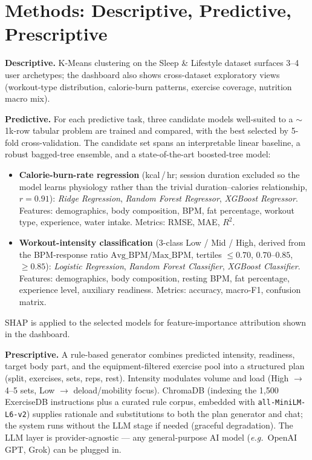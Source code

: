 \documentclass[10pt,a4paper]{article}
\begin{document}
\section{Methods: Descriptive, Predictive, Prescriptive}
\textbf{Descriptive.} K-Means clustering on the Sleep \& Lifestyle dataset surfaces 3--4 user archetypes; the dashboard also shows cross-dataset exploratory views (workout-type distribution, calorie-burn patterns, exercise coverage, nutrition macro mix).

\textbf{Predictive.} For each predictive task, three candidate models well-suited to a $\sim$1k-row tabular problem are trained and compared, with the best selected by 5-fold cross-validation. The candidate set spans an interpretable linear baseline, a robust bagged-tree ensemble, and a state-of-the-art boosted-tree model:
\begin{itemize}
  \item \textbf{Calorie-burn-rate regression} (kcal\,/\,hr; session duration excluded so the model learns physiology rather than the trivial duration--calories relationship, $r{=}0.91$): \emph{Ridge Regression}, \emph{Random Forest Regressor}, \emph{XGBoost Regressor}. Features: demographics, body composition, BPM, fat percentage, workout type, experience, water intake. Metrics: RMSE, MAE, $R^2$.
  \item \textbf{Workout-intensity classification} (3-class Low / Mid / High, derived from the BPM-response ratio $\mathrm{Avg\_BPM}/\mathrm{Max\_BPM}$, tertiles $\le 0.70$, $0.70$--$0.85$, $\ge 0.85$): \emph{Logistic Regression}, \emph{Random Forest Classifier}, \emph{XGBoost Classifier}. Features: demographics, body composition, resting BPM, fat percentage, experience level, auxiliary readiness. Metrics: accuracy, macro-F1, confusion matrix.
\end{itemize}
SHAP is applied to the selected models for feature-importance attribution shown in the dashboard.

\textbf{Prescriptive.} A rule-based generator combines predicted intensity, readiness, target body part, and the equipment-filtered exercise pool into a structured plan (split, exercises, sets, reps, rest). Intensity modulates volume and load (High $\rightarrow$ 4--5 sets, Low $\rightarrow$ deload/mobility focus). ChromaDB (indexing the 1{,}500 ExerciseDB instructions plus a curated rule corpus, embedded with \texttt{all-MiniLM-L6-v2}) supplies rationale and substitutions to both the plan generator and chat; the system runs without the LLM stage if needed (graceful degradation). The LLM layer is provider-agnostic --- any general-purpose AI model (\emph{e.g.}\ OpenAI GPT, Grok) can be plugged in.
\end{document}
